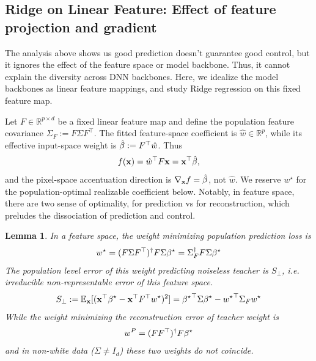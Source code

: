 \documentclass{article}
\providecommand{\lemmaname}{Lemma}
\theoremstyle{plain}
\newtheorem{lem}[thm]{\lemmaname}
\theoremstyle{definition}
\theoremstyle{remark}
\begin{document}
\subsection{Ridge on Linear Feature: Effect of feature projection and gradient} %
\label{sec:feature-ridge}
The analysis above shows us good prediction doesn't guarantee good control,
but it ignores the effect of the feature space or model backbone.
Thus, it cannot explain the diversity across DNN backbones.
Here, we idealize the model backbones as linear feature mappings, and study Ridge regression on this fixed feature map.

Let $F\in\mathbb{R}^{p\times d}$ be a fixed linear feature map and define the population feature covariance $\Sigma_F:=F\Sigma F^\top$. The fitted feature-space coefficient is $\hat w\in\mathbb{R}^p$, while its effective input-space weight is $\hat{\beta}:=F^\top\hat w$. Thus
\[
f(\mathbf{x})={\hat w}^{\top}F\mathbf{x}=\mathbf{x}^\top\hat{\beta},
\]
and the pixel-space accentuation direction is $\nabla_{\mathbf{x}} f=\hat{\beta}$, not $\hat w$. We reserve $w^\star$ for the population-optimal realizable coefficient below. 
Notably, in feature space, there are two sense of optimality, for prediction vs for reconstruction,
which preludes the dissociation of prediction and control.
\begin{lem}\label{lem:feature-population-projections}
In a feature space, the
weight minimizing population prediction loss is %
\begin{equation}
w^{\star}=(F\Sigma F^{\top})^{\dagger}F\Sigma{\beta^{\star}}=\Sigma_{F}^{\dagger}F\Sigma{\beta^{\star}}
\end{equation}
The population level error of this weight predicting noiseless teacher
is $S_{\perp}$, i.e. irreducible non-representable error of this
feature space.
\begin{equation}
S_{\perp}:=\mathbb{E}_{\mathbf{x}}[(\mathbf{x}^{\top}{\beta^{\star}}-\mathbf{x}^{\top}F^{\top}w^{\star})^{2}]={{\beta^{\star}}}^{\top}\Sigma{\beta^{\star}}-{w^\star}^{\top}\Sigma_{F}w^{\star}
\end{equation}
While the weight minimizing the reconstruction error of teacher weight is
\begin{equation}
w^{P}=(FF^{\top})^{\dagger}F{\beta^{\star}}
\end{equation}
and in non-white data ($\Sigma\neq I_d$) these two weights do not coincide.
\end{lem}
\end{document}
